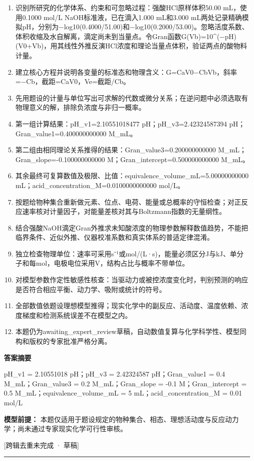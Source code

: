 \documentclass[UTF8,11pt,a4paper]{ctexart}
\begin{document}
\begin{enumerate}
\item 识别所研究的化学体系、约束和可忽略过程：强酸HCl原样体积50.00 mL，使用0.1000 mol/L NaOH标准液，已在滴入1.000 mL和3.000 mL两处记录精确模拟pH，分别为−log10(0.4000/51.00)和−log10(0.2000/53.00)。忽略活度系数、体积收缩及水自解离，滴定尚未到当量点。令Gran函数G(Vb)=10\textasciicircum{}(−pH)(V0+Vb)，用其线性外推反演HCl浓度和理论当量点体积，验证两点的酸物料计量。
\item 建立核心方程并说明各变量的标准态和物理含义：G=CaV0−CbVb，斜率=−Cb，截距=CaV0，Ve=截距/Cb。
\item 先用题设的计量与单位写出可求解的代数或微分关系；在逆问题中必须选取有物理意义的解，排除负浓度与非归一概率。
\item 第一组计算结果：pH\_v1=2.10551018477 pH；pH\_v3=2.42324587394 pH；Gran\_value1=0.400000000000 M\_mL。
\item 第二组由相同理论关系推得的结果：Gran\_value3=0.200000000000 M\_mL；Gran\_slope=-0.100000000000 M；Gran\_intercept=0.500000000000 M\_mL。
\item 其余最终可复算数值及极限、比值：equivalence\_volume\_mL=5.00000000000 mL；acid\_concentration\_M=0.0100000000000 mol/L。
\item 按题给物种集合重新做元素、位点、电荷、能量或总概率的守恒检查；对正反应速率核对计量因子，对能量差核对其与Boltzmann指数的无量纲性。
\item 结合强酸NaOH滴定Gran外推求未知酸浓度的物理参数解释数值趋势，不能把临界条件、近似外推、仪器校准系数和真实体系的普适定律混淆。
\item 独立检查物理单位：速率可采用s⁻¹或mol/(L·s)，能量必须区分J与kJ、单分子和每mol，电极电位采用V，结构占比与概率不带单位。
\item 对模型参数作定性敏感性核查：当驱动力或被控浓度变化时，判别预测的响应是否符合相应平衡、动力学、吸附或统计的符号。
\item 全部数值依题设理想模型推得；现实化学中的副反应、活动度、温度依赖、浓度梯度和检测系统误差不在模型之内。
\item 本题仍为awaiting\_expert\_review草稿，自动数值复算与化学科学性、模型同构和版权的专家批准严格分离。
\end{enumerate}
\noindent\textbf{答案摘要}\par
pH\_v1 = 2.10551018 pH；pH\_v3 = 2.42324587 pH；Gran\_value1 = 0.4 M\_mL；Gran\_value3 = 0.2 M\_mL；Gran\_slope = -0.1 M；Gran\_intercept = 0.5 M\_mL；equivalence\_volume\_mL = 5 mL；acid\_concentration\_M = 0.01 mol/L\par
\noindent\textbf{模型前提：}
本题仅适用于题设规定的物种集合、相态、理想活动度与反应动力学；尚未通过专家现实化学可行性审核。\par
\noindent\textcolor{red!65!black}{[跨辑去重未完成 · 草稿]} \par
\medskip\hrule\medskip
{}
\end{document}
